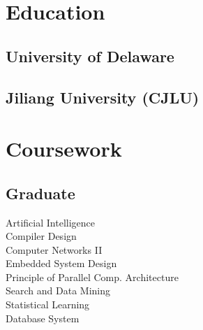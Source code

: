 \documentclass[]{deedy-resume-openfont}
\begin{document}
\lastupdated


%
%

\begin{minipage}[t]{0.33\textwidth} 


\section{Education} 

\subsection{University of Delaware}
\sectionsep

\subsection{Jiliang University (CJLU)}
\sectionsep


\section{Coursework}
\subsection{Graduate}
Artificial Intelligence \\
Compiler Design \\
Computer Networks II \\
Embedded System Design \\
Principle of Parallel Comp. Architecture \\
Search and Data Mining \\
Statistical Learning \\
Database System
\sectionsep


\end{minipage}
\end{document}
